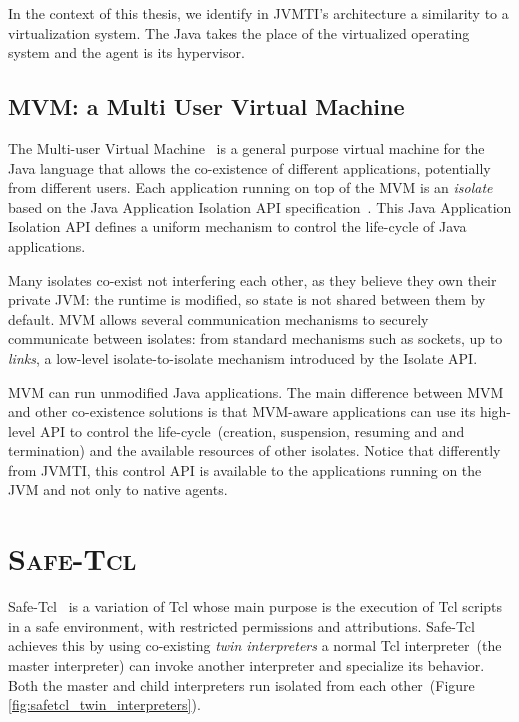 In the context of this thesis, we identify in JVMTI's architecture a similarity to a virtualization system. The Java \VM takes the place of the virtualized operating system and the agent is its hypervisor.

\subsection*{MVM: a Multi User Virtual Machine}
The Multi-user Virtual Machine~\cite{Czaj03a,Czaj01a} is a general purpose virtual machine for the Java language that allows the co-existence of different applications, potentially from different users. Each application running on top of the MVM is an \emph{isolate} based on the Java Application Isolation API specification~\cite{JSR121}. This Java Application Isolation API defines a uniform mechanism to control the life-cycle of Java applications.

Many isolates co-exist not interfering each other, as they believe they own their private JVM: the runtime is modified, so state is not shared between them by default. MVM allows several communication mechanisms to securely communicate between isolates: from standard mechanisms such as sockets, up to \emph{links}, a low-level isolate-to-isolate mechanism introduced by the Isolate API.

MVM can run unmodified Java applications. The main difference between MVM and other co-existence solutions is that MVM-aware applications can use its high-level API to control the life-cycle~(\eg creation, suspension, resuming and and termination) and the available resources of other isolates. Notice that differently from JVMTI, this control API is available to the applications running on the JVM and not only to native agents.

\section*{\textsc{Safe-Tcl}}
Safe-Tcl~\cite{Levy97a, Bore94a} is a variation of Tcl whose main purpose is the execution of Tcl scripts in a safe environment, with restricted permissions and attributions. Safe-Tcl achieves this by using co-existing \emph{twin interpreters} \ie a normal Tcl interpreter~(the master interpreter) can invoke another interpreter and specialize its behavior. Both the master and child interpreters run isolated from each other~(Figure \ref{fig:safetcl_twin_interpreters}).


